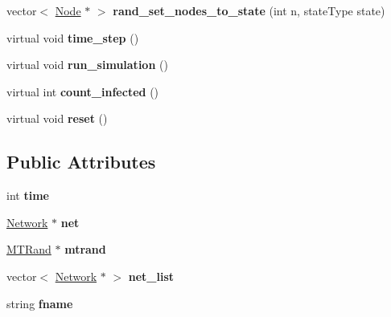 \begin{DoxyCompactItemize}
\item 
\hypertarget{classSimulator_a1b4bad3cfa952e283ac1576c2b9357a8}{}vector$<$ \hyperlink{classNode}{Node} $\ast$ $>$ {\bfseries rand\+\_\+set\+\_\+nodes\+\_\+to\+\_\+state} (int n, state\+Type state)\label{classSimulator_a1b4bad3cfa952e283ac1576c2b9357a8}

\item 
\hypertarget{classSimulator_a3bee1aeade42b904c9a561e0e4c84460}{}virtual void {\bfseries time\+\_\+step} ()\label{classSimulator_a3bee1aeade42b904c9a561e0e4c84460}

\item 
\hypertarget{classSimulator_accb74d40c16c3a6a7f658e5d272bdf0c}{}virtual void {\bfseries run\+\_\+simulation} ()\label{classSimulator_accb74d40c16c3a6a7f658e5d272bdf0c}

\item 
\hypertarget{classSimulator_a51fba2398daa6f380fa4034856735491}{}virtual int {\bfseries count\+\_\+infected} ()\label{classSimulator_a51fba2398daa6f380fa4034856735491}

\item 
\hypertarget{classSimulator_a23ddae46561995fccb3d5a769efa1294}{}virtual void {\bfseries reset} ()\label{classSimulator_a23ddae46561995fccb3d5a769efa1294}

\end{DoxyCompactItemize}
\subsection*{Public Attributes}
\begin{DoxyCompactItemize}
\item 
\hypertarget{classSimulator_aa81e60ca4246da452d64dddb70beb33f}{}int {\bfseries time}\label{classSimulator_aa81e60ca4246da452d64dddb70beb33f}

\item 
\hypertarget{classSimulator_a1570947a7c2c40c45f24a0d599463328}{}\hyperlink{classNetwork}{Network} $\ast$ {\bfseries net}\label{classSimulator_a1570947a7c2c40c45f24a0d599463328}

\item 
\hypertarget{classSimulator_a0f168636a3de4d3336a23606f3111173}{}\hyperlink{classMTRand}{M\+T\+Rand} $\ast$ {\bfseries mtrand}\label{classSimulator_a0f168636a3de4d3336a23606f3111173}

\item 
\hypertarget{classSimulator_a7fd4ec3cb930229a61fc31f9ba4a4ab2}{}vector$<$ \hyperlink{classNetwork}{Network} $\ast$ $>$ {\bfseries net\+\_\+list}\label{classSimulator_a7fd4ec3cb930229a61fc31f9ba4a4ab2}

\item 
\hypertarget{classSimulator_a413c5a4e5af6ada7fe66b7689678f087}{}string {\bfseries fname}\label{classSimulator_a413c5a4e5af6ada7fe66b7689678f087}

\end{DoxyCompactItemize}
